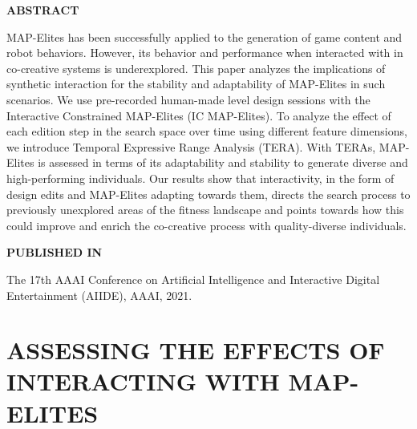 \graphicspath{{included-papers-tex/paper-9/}}



\normalfont
\textbf{\textsc{ABSTRACT}}

MAP-Elites has been successfully applied to the generation of game content and robot behaviors. However, its behavior and performance when interacted with in co-creative systems is underexplored. This paper analyzes the implications of synthetic interaction for the stability and adaptability of MAP-Elites in such scenarios. We use pre-recorded human-made level design sessions with the Interactive Constrained MAP-Elites (IC MAP-Elites). To analyze the effect of each edition step in the search space over time using different feature dimensions, we introduce Temporal Expressive Range Analysis (TERA). With TERAs, MAP-Elites is assessed in terms of its adaptability and stability to generate diverse and high-performing individuals. Our results show that interactivity, in the form of design edits and MAP-Elites adapting towards them, directs the search process to previously unexplored areas of the fitness landscape and points towards how this could improve and enrich the co-creative process with quality-diverse individuals.

\textbf{\textsc{PUBLISHED IN}}

The 17th AAAI Conference on Artificial Intelligence and Interactive Digital Entertainment (AIIDE), AAAI, 2021.

\section*{ASSESSING THE EFFECTS OF INTERACTING WITH MAP-ELITES}




% 

% 




